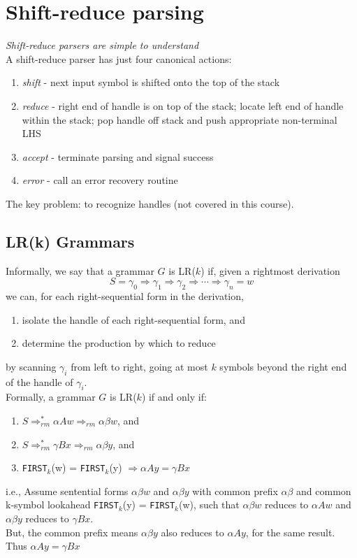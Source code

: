 \documentclass[10pt]{article}
\begin{document}
\section*{Shift-reduce parsing}
\textit{Shift-reduce parsers are simple to understand}\\
A shift-reduce parser has just four canonical actions:
\begin{enumerate}
    \item \textit{shift} - next input symbol is shifted onto the top of the stack
    \item \textit{reduce} - right end of handle is on top of the stack; locate left end of handle within the stack; pop handle off stack and push appropriate non-terminal LHS
    \item \textit{accept} - terminate parsing and signal success
    \item \textit{error} - call an error recovery routine
\end{enumerate}
The key problem: to recognize handles (not covered in this course).

\subsection*{LR(k) Grammars}
Informally, we say that a grammar $G$ is LR($k$) if, given a rightmost derivation
\[S = \gamma_0 \Rightarrow \gamma_1 \Rightarrow \gamma_2 \Rightarrow \cdots \Rightarrow \gamma_n = w\]
we can, for each right-sequential form in the derivation,
\begin{enumerate}
    \item isolate the handle of each right-sequential form, and
    \item determine the production by which to reduce
\end{enumerate}
by scanning $\gamma_i$ from left to right, going at most $k$ symbols beyond the right end of the handle of $\gamma_i$.\\
Formally, a grammar $G$ is LR($k$) if and only if:
\begin{enumerate}
    \item $S \Rightarrow_{rm}^* \alpha Aw \Rightarrow_{rm} \alpha \beta w$, and
    \item $S \Rightarrow^*_{rm} \gamma Bx \Rightarrow_{rm} \alpha \beta y$, and
    \item \texttt{FIRST}$_k$(w) = \texttt{FIRST}$_k$(y) $\Rightarrow \alpha Ay = \gamma Bx$ 
\end{enumerate}
i.e., Assume sentential forms $\alpha \beta w$ and $\alpha \beta y$ with common prefix $\alpha \beta$ and common k-symbol lookahead \texttt{FIRST}$_k$(y) = \texttt{FIRST}$_k$(w), such that $\alpha \beta w$ reduces to $\alpha Aw$ and $\alpha \beta y$ reduces to $\gamma Bx$.\\
But, the common prefix means $\alpha \beta y$ also reduces to $\alpha A y$, for the same result.\\
Thus $\alpha Ay = \gamma Bx$
\end{document}
